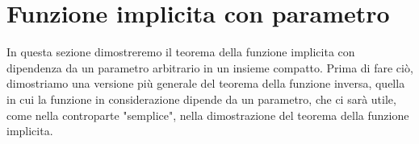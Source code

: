 
\section{Funzione implicita con parametro}

In questa sezione dimostreremo il teorema della funzione implicita con dipendenza da un parametro arbitrario in un insieme compatto. Prima di fare ciò, dimostriamo una versione più generale del teorema della funzione inversa, quella in cui la funzione in considerazione dipende da un parametro, che ci sarà utile, come nella controparte "semplice", nella dimostrazione del teorema della funzione implicita. \\

